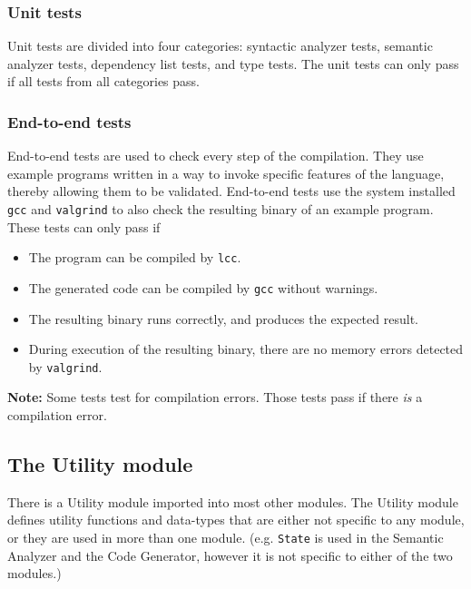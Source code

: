 \documentclass[12pt]{article}
\begin{document}
\subsubsection{Unit tests}

Unit tests are divided into four categories: syntactic analyzer tests, semantic
analyzer tests, dependency list tests, and type tests. The unit tests can only
pass if all tests from all categories pass.

\subsubsection{End-to-end tests}

End-to-end tests are used to check every step of the compilation. They use
example programs written in a way to invoke specific features of the language,
thereby allowing them to be validated. End-to-end tests use the system installed
\verb$gcc$ and \verb$valgrind$ to also check the resulting binary of an example
program. These tests can only pass if
\begin{itemize}
    \item The program can be compiled by \verb$lcc$.
    \item The generated code can be compiled by \verb$gcc$ without warnings.
    \item The resulting binary runs correctly, and produces the expected result.
    \item During execution of the resulting binary, there are no memory errors
        detected by \verb$valgrind$.
\end{itemize}
\textbf{Note:} Some tests test for compilation errors. Those tests pass if there
\emph{is} a compilation error.

\subsection{The Utility module}

There is a Utility module imported into most other modules. The Utility module
defines utility functions and data-types that are either not specific to any module, or they
are used in more than one module. (e.g. \verb$State$ is used in the Semantic
Analyzer and the Code Generator, however it is not specific to either of the two
modules.)
\end{document}
